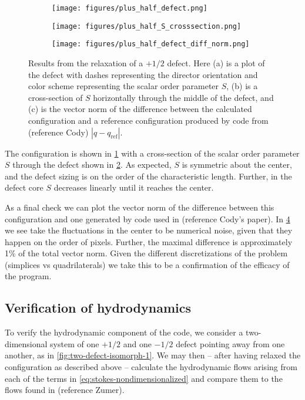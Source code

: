 \documentclass[reqno]{article}
\begin{document}
  \begin{figure}[h]
    \centering
    \begin{subfigure}{0.45\textwidth}
      \texttt{[image: figures/plus\_half\_defect.png]}
      \caption{}
      \label{fig:plus-half-defect}
    \end{subfigure}
    \hfill
    \begin{subfigure}{0.45\textwidth}
      \texttt{[image: figures/plus\_half\_S\_crosssection.png]}
      \caption{}
      \label{fig:plus-half-S-crosssection}
    \end{subfigure}
    \hfill
    \begin{subfigure}{0.45\textwidth}
      \texttt{[image: figures/plus\_half\_defect\_diff\_norm.png]}
      \caption{}
      \label{fig:plus-half-defect-diff-norm}
    \end{subfigure}
    \caption{Results from the relaxation of a $+1/2$ defect. Here (a) is a plot
      of the defect with dashes representing the director orientation and color
      scheme representing the scalar order parameter $S$, (b) is a cross-section
    of $S$ horizontally through the middle of the defect, and (c) is the vector
    norm of the difference between the calculated configuration and a reference
    configuration produced by code from (reference Cody) $|q - q_\text{ref}|$.}
  \end{figure}

  The configuration is shown in \ref{fig:plus-half-defect} with a cross-section of the
  scalar order parameter $S$ through the defect shown in \ref{fig:plus-half-S-crosssection}.
  As expected, $S$ is symmetric about the center, and the defect sizing is on
  the order of the characteristic length.
  Further, in the defect core $S$ decreases linearly until it reaches the
  center.
  
  As a final check we can plot the vector norm of the difference between
  this configuration and one generated by code used in (reference Cody's paper).
  In \ref{fig:plus-half-defect-diff-norm} we see take the fluctuations in the center to be
  numerical noise, given that they happen on the order of pixels.
  Further, the maximal difference is approximately 1\% of the total vector norm.
  Given the different discretizations of the problem (simplices vs
  quadrilaterals) we take this to be a confirmation of the efficacy of the program.
  
  \subsection{Verification of hydrodynamics}
  To verify the hydrodynamic component of the code, we consider a
  two-dimensional system of one
  $+1/2$ and one $-1/2$ defect pointing away from one another, as in
  \ref{fig:two-defect-isomorph-1}.
  We may then -- after having relaxed the configuration as described above --
  calculate the hydrodynamic flows arising from each of the terms in
  \eqref{eq:stokes-nondimensionalized} and compare them to the flows found in
  (reference Zumer).
  
\end{document}
